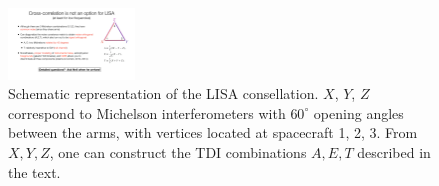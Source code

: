 \begin{figure}[htbp!]
\begin{center}
\includegraphics[width=0.3\textwidth]{Figures/LISA_XYZ}
\caption{Schematic representation of the LISA consellation.
$X$, $Y$, $Z$ correspond to Michelson interferometers 
with $60^\circ$ opening angles between the arms, with vertices
located at spacecraft 1, 2, 3.
From $X, Y, Z$, one can construct the TDI combinations
$A, E, T$ described in the text.}
\label{f:LISA_XYZ}
\end{center}
\end{figure}

